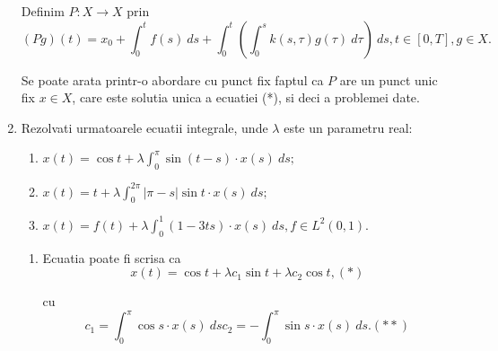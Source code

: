 \documentclass[a4paper,12pt,oneside]{report}
\begin{document}
\begin{enumerate}
		      	Definim \(P : X \rightarrow X\) prin 
		      	\begin{displaymath}
		      		\left ( Pg \right )\left ( t \right ) = x_{0} + \int_{0}^{t}f\left ( s \right ) \ ds + \int_{0}^{t}\left ( \int_{0}^{s}k\left ( s,\tau  \right )g\left ( \tau  \right ) \ d\tau  \right ) \ ds, t \in \left [ 0, T \right ], g \in X.
		      	\end{displaymath}
		      			      			      			      	
		      	Se poate arata printr-o abordare cu punct fix faptul ca \(P\) are un punct unic fix \(x \in X\), care este solutia unica a ecuatiei (*), si deci a problemei date. 
		      			      			      			      		
		      	\item Rezolvati urmatoarele ecuatii integrale, unde \(\lambda\) este un parametru real: 
		      	\begin{enumerate}[label=(\alph*)]
		      		\item \(x\left ( t \right ) = \cos t + \lambda \int_{0}^{\pi }\sin \left ( t-s \right )\cdot x\left ( s \right ) \ ds;\)
		      		\item \(x\left ( t \right ) =  t + \lambda \int_{0}^{2\pi }\left | \pi - s \right |\sin t \cdot x\left ( s \right ) \ ds;\)
		      		\item \(x\left ( t \right ) = f \left (t  \right ) + \lambda \int_{0}^{1 }\left ( 1 - 3ts  \right )\cdot x\left ( s \right ) \ ds , f \in L^{2}\left ( 0,1 \right ).\) 
		      	\end{enumerate}
		      			      			      			      		
		      			      			      			      		
		      	\begin{enumerate}[label=(\alph*)]
		      		\item Ecuatia poate fi scrisa ca 
		      		      \begin{displaymath}
		      		      	x\left ( t \right ) = \cos t + \lambda c_{1}\sin t + \lambda c_{2}\cos t, (*)
		      		      \end{displaymath}
		      		      		      		      		      		      		      		      
		      		      cu 
		      		      \begin{displaymath}
		      		      	c_{1} = \int_{0}^{\pi }\cos s \cdot x\left ( s \right ) \ ds c_{2} = -\int_{0}^{\pi }\sin s \cdot x\left ( s \right ) \ ds. (**)
		      		      \end{displaymath}
		      		      		      		      		      		      		      		      

\end{enumerate}
\end{enumerate}
\end{document}
